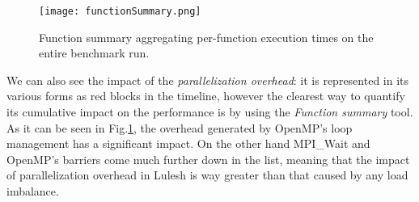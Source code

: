 \documentclass{article}
\begin{document}
\begin{enumerate}
	\begin{figure}[p] %
		\begin{center}
			\texttt{[image: functionSummary.png]}
		\cprotect\caption{Function summary aggregating per-function execution times on the entire benchmark run.}
		\label{fig:functionSummary}
		\end{center}
	\end{figure}

	We can also see the impact of the \emph{parallelization overhead}: it is represented in its various forms as red blocks in the timeline, however the clearest way to quantify its cumulative impact on the performance is by using the \emph{Function summary} tool. As it can be seen in Fig.\ref{fig:functionSummary}, the overhead generated by OpenMP's loop management has a significant impact. On the other hand MPI\_Wait and OpenMP's barriers come much further down in the list, meaning that the impact of parallelization overhead in Lulesh is way greater than that caused by any load imbalance.
\end{enumerate}

\end{document}
